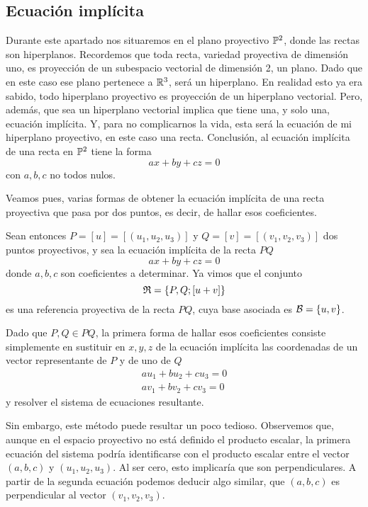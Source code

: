 \subsection{Ecuación implícita}
Durante este apartado nos situaremos en el plano proyectivo $\mathbb{P}^2$, donde las rectas son hiperplanos. Recordemos que toda recta, variedad proyectiva de dimensión uno, es proyección de un subespacio vectorial de dimensión 2, un plano. Dado que en este caso ese plano pertenece a $\mathbb{R}^3$, será un hiperplano. En realidad esto ya era sabido, todo hiperplano proyectivo es proyección de un hiperplano vectorial. Pero, además, que sea un hiperplano vectorial implica que tiene una, y solo una, ecuación implícita. Y, para no complicarnos la vida, esta será la ecuación de mi hiperplano proyectivo, en este caso una recta. 
Conclusión, al ecuación implícita de una recta en $\mathbb{P}^2$ tiene la forma
\begin{equation*}
	ax+by+cz=0
\end{equation*}
con $a,b,c$ no todos nulos. 

Veamos pues, varias formas de obtener la ecuación implícita de una recta proyectiva que pasa por dos puntos, es decir, de hallar esos coeficientes.

Sean entonces $P=[u]=[(u_1,u_2,u_3)]$ y $Q=[v]=[(v_1,v_2,v_3)]$ dos puntos proyectivos, y sea la ecuación implícita de la recta $PQ$
\begin{equation*}
	ax+by+cz=0
\end{equation*}
donde $a,b,c$ son coeficientes a determinar. Ya vimos que el conjunto
\[\mathfrak{R}=\{P,Q;\left [ u+v \right ]\}\]
es una referencia proyectiva de la recta $PQ$, cuya base asociada es $\mathcal{B}=\{u,v\}$.

Dado que $P,Q\in PQ$, la primera forma de hallar esos coeficientes consiste simplemente en sustituir en $x,y,z$ de la ecuación implícita las coordenadas de un vector representante de $P$ y de uno de $Q$
\begin{equation*}
	\begin{split}
		au_1+bu_2+cu_3=0\\
		av_1+bv_2+cv_3=0
	\end{split}
\end{equation*}
y resolver el sistema de ecuaciones resultante.

Sin embargo, este método puede resultar un poco tedioso. Observemos que, aunque en el espacio proyectivo no está definido el producto escalar, la primera ecuación del sistema podría identificarse con el producto escalar entre el vector $(a,b,c)$ y $(u_1,u_2,u_3)$. Al ser cero, esto implicaría que son perpendiculares. A partir de la segunda ecuación podemos deducir algo similar, que $(a,b,c)$ es perpendicular al vector $(v_1,v_2,v_3)$.

